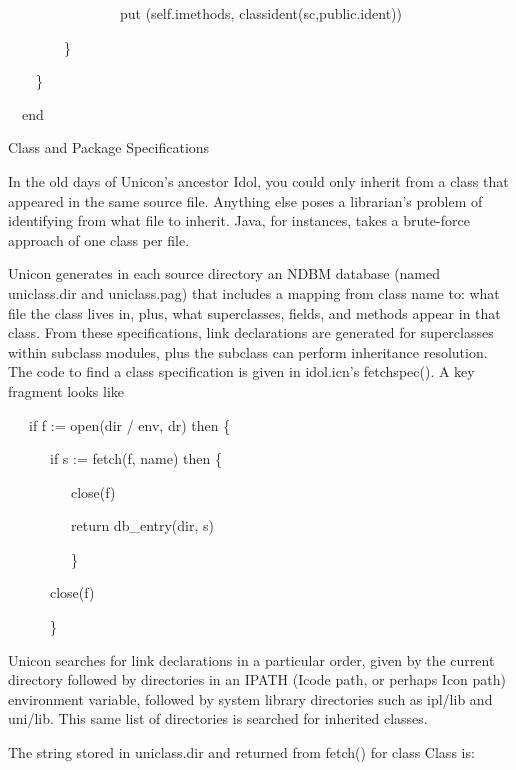 {\ttfamily\mdseries
\ \ \ \ \ \ \ \ \ \ \ \ \ \ \ \ put (self.imethods, classident(sc,public.ident))}

{\ttfamily\mdseries
\ \ \ \ \ \ \ \ \}}

{\ttfamily\mdseries
\ \ \ \ \}}

{\ttfamily\mdseries
\ \ end}

{\sffamily
Class and Package Specifications }


In the {\textquotedbl}old days{\textquotedbl} of Unicon's ancestor
Idol, you could only inherit from a class that appeared in the same
source file. Anything else poses a librarian's problem of identifying
from what file to inherit.  Java, for instances, takes a brute-force
approach of one class per file.

Unicon generates in each source directory an NDBM database (named
uniclass.dir and uniclass.pag) that includes a mapping from class name
to: what file the class lives in, plus, what superclasses, fields, and
methods appear in that class.  From these specifications,
{\textquotedbl}link{\textquotedbl} declarations are generated for
superclasses within subclass modules, plus the subclass can perform
inheritance resolution. The code to find a class specification is
given in idol.icn's fetchspec(). A key fragment looks like

{\ttfamily\mdseries
\ \ \ if f := open(dir {\textbar}{\textbar} {\textquotedbl}/{\textquotedbl} {\textbar}{\textbar} env,
{\textquotedbl}dr{\textquotedbl}) then \{}

{\ttfamily\mdseries
\ \ \ \ \ \ if s := fetch(f, name) then \{}

{\ttfamily\mdseries
\ \ \ \ \ \ \ \ \ close(f)}

{\ttfamily\mdseries
\ \ \ \ \ \ \ \ \ return db\_entry(dir, s)}

{\ttfamily\mdseries
\ \ \ \ \ \ \ \ \ \}}

{\ttfamily\mdseries
\ \ \ \ \ \ close(f)}

{\ttfamily\mdseries
\ \ \ \ \ \ \}}


Unicon searches for {\textquotedbl}link{\textquotedbl} declarations in
a particular order, given by the current directory followed by
directories in an IPATH (Icode path, or perhaps Icon path) environment
variable, followed by system library directories such as ipl/lib and
uni/lib. This same list of directories is searched for inherited
classes.


The string stored in uniclass.dir and returned from fetch() for class Class is: 

